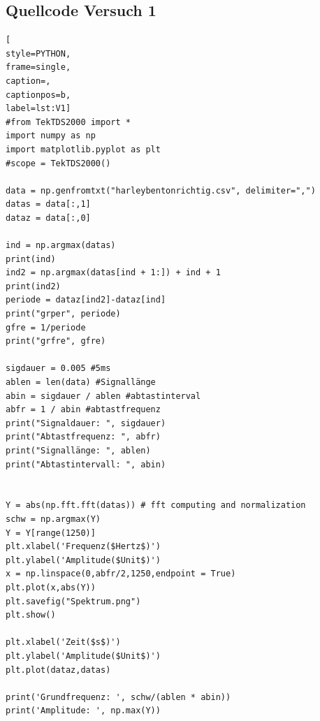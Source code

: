 \documentclass[12pt, oneside, a4paper, \docLanguage]{report}
\begin{document}
\subsection{Quellcode Versuch 1}
\label{chap:APPENDIX_SOURCECODE_V1}
\begin{lstlisting}[
style=PYTHON,
frame=single,
caption=,
captionpos=b,
label=lst:V1]
#from TekTDS2000 import *
import numpy as np
import matplotlib.pyplot as plt
#scope = TekTDS2000()

data = np.genfromtxt("harleybentonrichtig.csv", delimiter=",")
datas = data[:,1]
dataz = data[:,0]

ind = np.argmax(datas)
print(ind)
ind2 = np.argmax(datas[ind + 1:]) + ind + 1
print(ind2)
periode = dataz[ind2]-dataz[ind]
print("grper", periode)
gfre = 1/periode
print("grfre", gfre)

sigdauer = 0.005 #5ms
ablen = len(data) #Signallänge
abin = sigdauer / ablen #abtastinterval
abfr = 1 / abin #abtastfrequenz
print("Signaldauer: ", sigdauer)
print("Abtastfrequenz: ", abfr)
print("Signallänge: ", ablen)
print("Abtastintervall: ", abin)


Y = abs(np.fft.fft(datas)) # fft computing and normalization
schw = np.argmax(Y)
Y = Y[range(1250)]
plt.xlabel('Frequenz($Hertz$)')
plt.ylabel('Amplitude($Unit$)')
x = np.linspace(0,abfr/2,1250,endpoint = True)
plt.plot(x,abs(Y))
plt.savefig("Spektrum.png")
plt.show()

plt.xlabel('Zeit($s$)')
plt.ylabel('Amplitude($Unit$)')
plt.plot(dataz,datas)

print('Grundfrequenz: ', schw/(ablen * abin))
print('Amplitude: ', np.max(Y))
\end{lstlisting}
\end{document}
